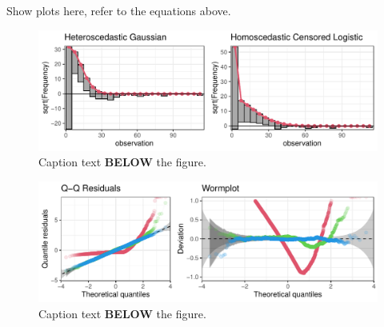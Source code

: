 \documentclass[twoside]{report}
\begin{document}
Show plots here, refer to the equations above.

\begin{figure}[!ht]\centering
    \includegraphics[width=\textwidth]{Stauffer-rootograms}
    \caption{\label{stauffer:fig1} Caption text \textbf{BELOW} the figure.}
\end{figure}

\begin{figure}[!ht]\centering
    \includegraphics[width=\textwidth]{Stauffer-qqresiduals}
    \caption{\label{stauffer:fig2} Caption text \textbf{BELOW} the figure.}
\end{figure}





\end{document}
